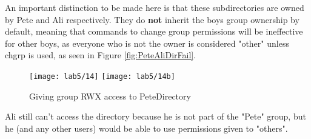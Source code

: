 An important distinction to be made here is that these subdirectories are owned by Pete and
Ali respectively.
They do \textbf{not} inherit the boys group ownership by default, meaning that commands to
change group permissions will be ineffective for other boys, as everyone who is not the owner
is considered "other" unless chgrp is used, as seen in Figure \ref{fig:PeteAliDirFail}.

\begin{figure}[H]
    \centering
    \texttt{[image: lab5/14]}
    \texttt{[image: lab5/14b]}
    \caption{Giving group RWX access to PeteDirectory}
    \label{fig:PeteDirFail}
\end{figure}

Ali still can't access the directory because he is not part of the "Pete" group, but he
(and any other users) would be able to use permissions given to "others".







